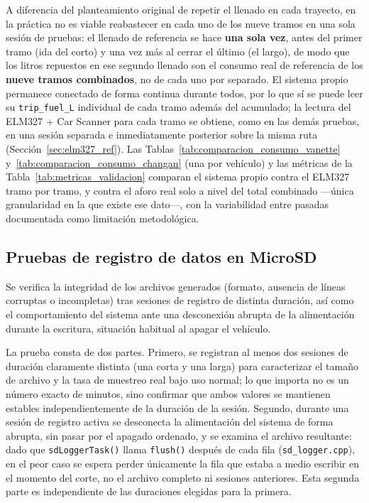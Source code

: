 A diferencia del planteamiento original de repetir el llenado en cada trayecto, en la práctica no es viable reabastecer en cada uno de los nueve tramos en una sola sesión de pruebas: el llenado de referencia se hace \textbf{una sola vez}, antes del primer tramo (ida del corto) y una vez más al cerrar el último (el largo), de modo que los litros repuestos en ese segundo llenado son el consumo real de referencia de los \textbf{nueve tramos combinados}, no de cada uno por separado. El sistema propio permanece conectado de forma continua durante todos, por lo que sí se puede leer su \texttt{trip\_fuel\_L} individual de cada tramo además del acumulado; la lectura del ELM327 + Car Scanner para cada tramo se obtiene, como en las demás pruebas, en una sesión separada e inmediatamente posterior sobre la misma ruta (Sección~\ref{sec:elm327_ref}). Las Tablas~\ref{tab:comparacion_consumo_vanette} y~\ref{tab:comparacion_consumo_changan} (una por vehículo) y las métricas de la Tabla~\ref{tab:metricas_validacion} comparan el sistema propio contra el ELM327 tramo por tramo, y contra el aforo real solo a nivel del total combinado —única granularidad en la que existe ese dato—, con la variabilidad entre pasadas documentada como limitación metodológica.

\subsection{Pruebas de registro de datos en MicroSD}
\label{sec:pruebas_microsd}

Se verifica la integridad de los archivos generados (formato, ausencia de líneas corruptas o incompletas) tras sesiones de registro de distinta duración, así como el comportamiento del sistema ante una desconexión abrupta de la alimentación durante la escritura, situación habitual al apagar el vehículo.

La prueba consta de dos partes. Primero, se registran al menos dos sesiones de duración claramente distinta (una corta y una larga) para caracterizar el tamaño de archivo y la tasa de muestreo real bajo uso normal; lo que importa no es un número exacto de minutos, sino confirmar que ambos valores se mantienen estables independientemente de la duración de la sesión. Segundo, durante una sesión de registro activa se desconecta la alimentación del sistema de forma abrupta, sin pasar por el apagado ordenado, y se examina el archivo resultante: dado que \texttt{sdLoggerTask()} llama \texttt{flush()} después de cada fila (\texttt{sd\_logger.cpp}), en el peor caso se espera perder únicamente la fila que estaba a medio escribir en el momento del corte, no el archivo completo ni sesiones anteriores. Esta segunda parte es independiente de las duraciones elegidas para la primera.

